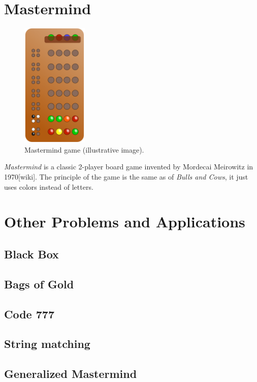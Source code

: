 \section{Mastermind}

\begin{figure}
  \begin{center}
  \vspace{-5mm}
  \includegraphics[width=0.28\textwidth]{pictures/mastermind.png}
  \vspace{-5mm}
  \end{center}
  \caption{Mastermind game (illustrative image).}
  \vspace{-10mm}
\end{figure}

\emph{Mastermind} is a classic 2-player board game invented
  by Mordecai Meirowitz in 1970[wiki].
The principle of the game is the same as of \emph{Bulls and Cows},
  it just uses colors instead of letters.

\section{Other Problems and Applications}
\subsection{Black Box}
\subsection{Bags of Gold}

\subsection{Code 777}

\subsection{String matching}

\subsection{Generalized Mastermind}


